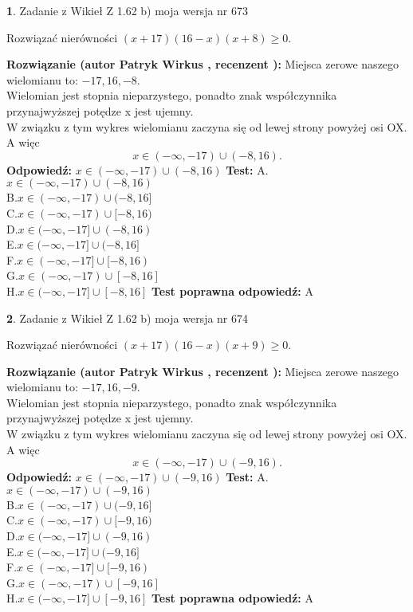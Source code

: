 \documentclass[12pt, a4paper]{article}
\theoremstyle{definition} %
\newtheorem{zad}{}
\newcommand{\zadStart}[1]{\begin{zad}#1\newline}
\newcommand{\zadStop}{\end{zad}}
\newcommand{\rozwStart}[2]{\noindent \textbf{Rozwiązanie (autor #1 , recenzent #2): }\newline}
\newcommand{\rozwStop}{\newline}
\newcommand{\odpStart}{\noindent \textbf{Odpowiedź:}\newline}
\newcommand{\odpStop}{\newline}
\newcommand{\testStart}{\noindent \textbf{Test:}\newline}
\newcommand{\testStop}{\newline}
\newcommand{\kluczStart}{\noindent \textbf{Test poprawna odpowiedź:}\newline}
\newcommand{\kluczStop}{\newline}
\begin{document}
\zadStart{Zadanie z Wikieł Z 1.62 b) moja wersja nr 673}

Rozwiązać nierówności $(x+17)(16-x)(x+8)\ge0$.
\zadStop
\rozwStart{Patryk Wirkus}{}
Miejsca zerowe naszego wielomianu to: $-17, 16, -8$.\\
Wielomian jest stopnia nieparzystego, ponadto znak współczynnika przy\linebreak najwyższej potędze x jest ujemny.\\ W związku z tym wykres wielomianu zaczyna się od lewej strony powyżej osi OX. A więc $$x \in (-\infty,-17) \cup (-8,16).$$
\rozwStop
\odpStart
$x \in (-\infty,-17) \cup (-8,16)$
\odpStop
\testStart
A.$x \in (-\infty,-17) \cup (-8,16)$\\
B.$x \in (-\infty,-17) \cup (-8,16]$\\
C.$x \in (-\infty,-17) \cup [-8,16)$\\
D.$x \in (-\infty,-17] \cup (-8,16)$\\
E.$x \in (-\infty,-17] \cup (-8,16]$\\
F.$x \in (-\infty,-17] \cup [-8,16)$\\
G.$x \in (-\infty,-17) \cup [-8,16]$\\
H.$x \in (-\infty,-17] \cup [-8,16]$
\testStop
\kluczStart
A
\kluczStop



\zadStart{Zadanie z Wikieł Z 1.62 b) moja wersja nr 674}

Rozwiązać nierówności $(x+17)(16-x)(x+9)\ge0$.
\zadStop
\rozwStart{Patryk Wirkus}{}
Miejsca zerowe naszego wielomianu to: $-17, 16, -9$.\\
Wielomian jest stopnia nieparzystego, ponadto znak współczynnika przy\linebreak najwyższej potędze x jest ujemny.\\ W związku z tym wykres wielomianu zaczyna się od lewej strony powyżej osi OX. A więc $$x \in (-\infty,-17) \cup (-9,16).$$
\rozwStop
\odpStart
$x \in (-\infty,-17) \cup (-9,16)$
\odpStop
\testStart
A.$x \in (-\infty,-17) \cup (-9,16)$\\
B.$x \in (-\infty,-17) \cup (-9,16]$\\
C.$x \in (-\infty,-17) \cup [-9,16)$\\
D.$x \in (-\infty,-17] \cup (-9,16)$\\
E.$x \in (-\infty,-17] \cup (-9,16]$\\
F.$x \in (-\infty,-17] \cup [-9,16)$\\
G.$x \in (-\infty,-17) \cup [-9,16]$\\
H.$x \in (-\infty,-17] \cup [-9,16]$
\testStop
\kluczStart
A
\kluczStop
\end{document}
